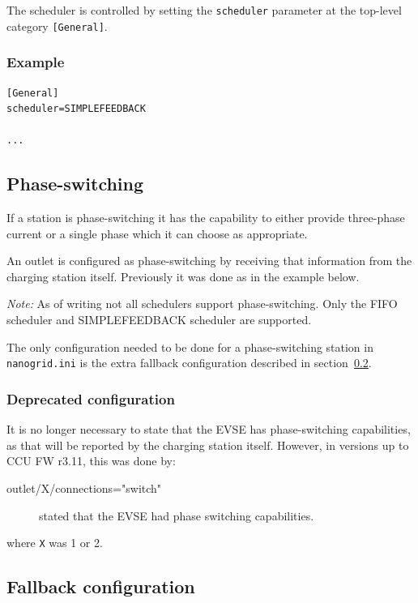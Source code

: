 \documentclass[10pt,a4paper,oneside,headings=big,headsepline]{scrreprt}
\begin{document}
The scheduler is controlled by setting the \verb|scheduler| parameter at
the top-level category \verb|[General]|.

\subsubsection{Example}

\begin{verbatim}
[General]
scheduler=SIMPLEFEEDBACK

...
\end{verbatim}

\subsection{Phase-switching}

If a station is phase-switching it has the capability to either
provide three-phase current or a single phase which it can choose as
appropriate.

An outlet is configured as phase-switching by receiving that information from
the charging station itself. Previously it was done as in the example below.

\emph{Note:} As of writing not all schedulers support
phase-switching. Only the FIFO scheduler and SIMPLEFEEDBACK scheduler are
supported.

The only configuration needed to be done for a phase-switching station in
\verb|nanogrid.ini| is the extra fallback configuration described in
section~\ref{sec:fallb-conf}.


\subsubsection{Deprecated configuration}
\label{sec:depr-conf-phase-switching}

It is no longer necessary to state that the EVSE has phase-switching
capabilities, as that will be reported by the charging station
itself. However, in versions up to CCU FW r3.11, this was done by:
\begin{description}
\item[outlet/X/connections="switch"] stated that the EVSE had phase switching
  capabilities.
\end{description}
where \verb|X| was 1 or 2.


\subsection{Fallback configuration}
\label{sec:fallb-conf}
\end{document}
